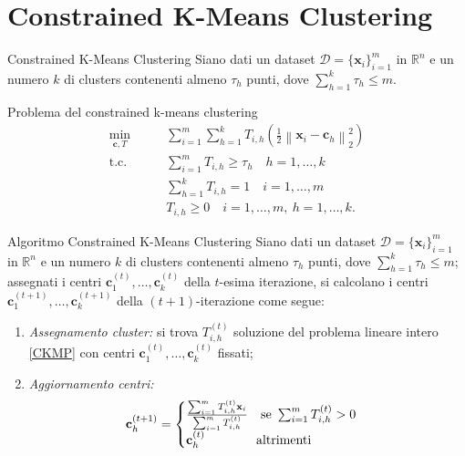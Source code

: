 \documentclass{beamer}
\begin{document}
\section{Constrained K-Means Clustering}
\begin{frame}{Constrained K-Means Clustering}
	Siano dati un dataset $\mathcal{D} = \{\textbf{x}_i\}^m_{i=1}$ in $\mathbb{R}^n$ e un numero $k$ di clusters contenenti almeno $ \tau_h $ punti, dove $ \sum_{h=1}^{k}\tau_h \le m $.
	\begin{block}{Problema del constrained k-means clustering}
		\vspace{-0.8cm}
		\begin{equation}
			\begin{split}
				\underset{\textbf{c}, T}{\text{min}}&\qquad \sum_{i=1}^{m}\sum_{h=1}^{k} T_{i,h} \left( \frac{1}{2} \left\| \textbf{x}_i - \textbf{c}_h \right\|^2_2  \right) \\
				\text{t.c.}&\qquad \sum_{i=1}^{m} T_{i,h} \ge \tau_h \quad h = 1, \dots,k\\
				& \qquad\sum_{h=1}^{k} T_{i,h} = 1 \quad i = 1, \dots, m\\
				& \qquad T_{i,h} \ge 0 \quad i = 1, \dots, m,\ h = 1, \dots,k.
			\end{split}
		\label{CKMP}
		\end{equation}
	\vspace{-0.5cm}
	\end{block}
\end{frame}
\begin{frame}
	\begin{block}{Algoritmo Constrained K-Means Clustering}
			Siano dati un dataset $\mathcal{D} = \{\textbf{x}_i\}^m_{i=1}$ in $\mathbb{R}^n$ e un numero $k$ di clusters contenenti almeno $ \tau_h $ punti, dove $ \sum_{h=1}^{k}\tau_h \le m $; assegnati i centri $ \textbf{c}_{1}^{(t)}, \dots, \textbf{c}_{k}^{(t)} $ della $ t $-esima iterazione, si calcolano i centri $ \textbf{c}_{1}^{(t+1)}, \dots, \textbf{c}_{k}^{(t+1)} $ della $ (t+1) $-iterazione come segue:
			\begin{enumerate}
				\item \textit{Assegnamento cluster:} si trova $ T_{i,h}^{(t)} $ soluzione del problema lineare intero \eqref{CKMP} con centri $ \textbf{c}_{1}^{(t)}, \dots, \textbf{c}_{k}^{(t)} $ fissati;
				\item \textit{Aggiornamento centri:} 
				\vspace{-0.3cm}
				\[ \textbf{c}_{h}^{(t+1)} = \begin{cases}
					\frac{\sum_{i=1}^{m}T_{i,h}^{(t)}\textbf{x}_i}{\sum_{i=1}^{m}T_{i,h}^{(t)}} \quad \text{se} \ \sum_{i=1}^{m}T_{i,h}^{(t)} > 0\\
					\vspace{-0.5cm}\\
					\textbf{c}_{h}^{(t)}\qquad\qquad \text{altrimenti}
				\end{cases} \]
			\end{enumerate}
	\end{block}
\end{frame}
\end{document}
